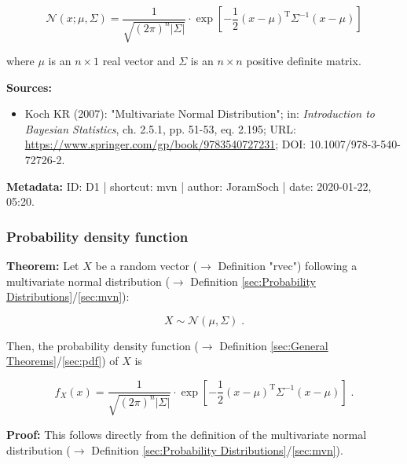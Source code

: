 \documentclass[a4paper,12pt]{book}
\begin{document}
\begin{equation} \label{eq:mvn-mvn-pdf}
\mathcal{N}(x; \mu, \Sigma) = \frac{1}{\sqrt{(2 \pi)^n |\Sigma|}} \cdot \exp \left[ -\frac{1}{2} (x-\mu)^\mathrm{T} \Sigma^{-1} (x-\mu) \right]
\end{equation}

where $\mu$ is an $n \times 1$ real vector and $\Sigma$ is an $n \times n$ positive definite matrix.

\vspace{1em}
\textbf{Sources:}
\begin{itemize}
\item Koch KR (2007): "Multivariate Normal Distribution"; in: \textit{Introduction to Bayesian Statistics}, ch. 2.5.1, pp. 51-53, eq. 2.195; URL: \url{https://www.springer.com/gp/book/9783540727231}; DOI: 10.1007/978-3-540-72726-2.
\end{itemize}


\vspace{1em}
\textbf{Metadata:} ID: D1 | shortcut: mvn | author: JoramSoch | date: 2020-01-22, 05:20.


\subsubsection[\textbf{Probability density function}]{Probability density function} \label{sec:mvn-pdf}

\vspace{1em}
\textbf{Theorem:} Let $X$ be a random vector ($\rightarrow$ Definition "rvec") following a multivariate normal distribution ($\rightarrow$ Definition \ref{sec:Probability Distributions}/\ref{sec:mvn}):

\begin{equation} \label{eq:mvn-pdf-mvn}
X \sim \mathcal{N}(\mu, \Sigma) \; .
\end{equation}

Then, the probability density function ($\rightarrow$ Definition \ref{sec:General Theorems}/\ref{sec:pdf}) of $X$ is

\begin{equation} \label{eq:mvn-pdf-mvn-pdf}
f_X(x) = \frac{1}{\sqrt{(2 \pi)^n |\Sigma|}} \cdot \exp \left[ -\frac{1}{2} (x-\mu)^\mathrm{T} \Sigma^{-1} (x-\mu) \right] \; .
\end{equation}


\vspace{1em}
\textbf{Proof:} This follows directly from the definition of the multivariate normal distribution ($\rightarrow$ Definition \ref{sec:Probability Distributions}/\ref{sec:mvn}).
\end{document}
